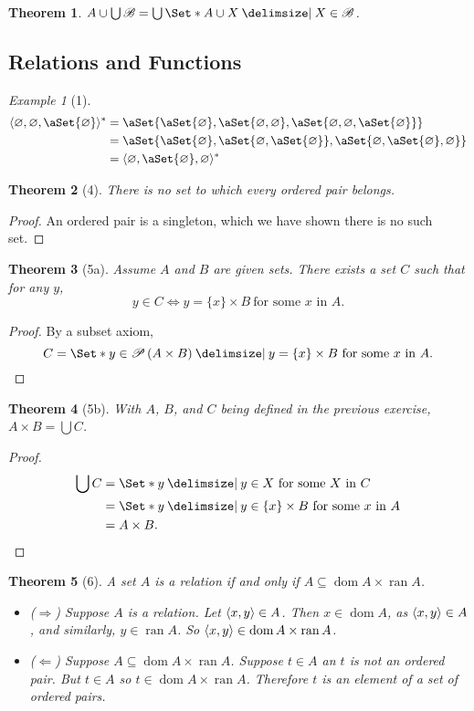 \documentclass[12pt]{article}
\theoremstyle{plain}
\newtheorem*{exthm}{Theorem}
\theoremstyle{remark}
\newtheorem*{eg}{Example}
\theoremstyle{definition}
\theoremstyle{remark}
\newcommand{\powerset}{\mathscr{P}\,}
\providecommand\st{}
\newcommand\SetSymbol[1][]{%
\nonscript\:#1\vert%
\allowbreak%
\nonscript\:
\mathopen{}}
\DeclarePairedDelimiter{\ang}{\langle}{\rangle}
\renewcommand\st{\SetSymbol[\delimsize]}
\DeclarePairedDelimiter\aSet\{\}
\renewcommand{\iff}{\Leftrightarrow}
\DeclareMathOperator{\dom}{dom}
\DeclareMathOperator{\ran}{ran}
\begin{document}
\begin{exthm}
$A \cup \bigcup \mathscr{B} = \bigcup\Set*{A \cup X \st X \in \mathscr{B}}$.
\end{exthm}

\subsection{Relations and Functions}
\begin{eg}[1]
\begin{align*}
\ang{\varnothing, \varnothing, \aSet{\varnothing}}^* &=
\aSet{\aSet{\varnothing}, \aSet{\varnothing, \varnothing}, \aSet{\varnothing, \varnothing, \aSet{\varnothing}}}\\
&=  \aSet{\aSet{\varnothing}, \aSet{\varnothing, \aSet{\varnothing}}, \aSet{\varnothing, \aSet{\varnothing}, \varnothing}}\\
&= \ang{\varnothing, \aSet{\varnothing}, \varnothing}^*
\end{align*}
\end{eg}
\begin{exthm}[4]
There is no set to which every ordered pair belongs.
\end{exthm}
\begin{proof}
An ordered pair is a singleton, which we have shown there is no such set.
\end{proof}
\begin{exthm}[5a]
Assume $A$ and $B$ are given sets. There exists a set $C$ such that for any $y$,
\[
y \in C \iff y = \{x\} \times B\ \text{for some $x$ in $A$}.
\]
\end{exthm}
\begin{proof}
By a subset axiom,
\[
C = \Set*{y \in \powerset (A \times B) \st y = \{x\} \times B\ \text{for some $x$ in $A$}}.
\]
\end{proof}
\begin{exthm}[5b]
With $A$, $B$, and $C$ being defined in the previous exercise, $A \times B = \bigcup C$.
\end{exthm}
\begin{proof}
\begin{align*}
\bigcup C &= \Set*{y \st y \in X\ \text{for some $X$ in $C$}}\\
&= \Set*{y \st y \in \{x\} \times B\ \text{for some $x$ in $A$}}\\
&= A \times B.
\end{align*}
\end{proof}
\begin{exthm}[6]
A set $A$ is a relation if and only if $A \subseteq \dom{A} \times \ran{A}$.
\begin{itemize}
\item ($\Rightarrow$) Suppose $A$ is a relation. Let $\ang{x,y} \in A$. Then $x \in \dom{A}$, as $\ang{x,y} \in A$, and similarly, $y \in \ran{A}$. So $\ang{x,y} \in \dom{A} \times \ran{A}$.
\item ($\Leftarrow$) Suppose $A \subseteq \dom{A} \times \ran{A}$. Suppose $t \in A$ an $t$ is not an ordered pair. But $t \in A$ so $t \in \dom{A} \times \ran{A}$. Therefore $t$ is an element of a set of ordered pairs.
\end{itemize}
\end{exthm}
\end{document}
